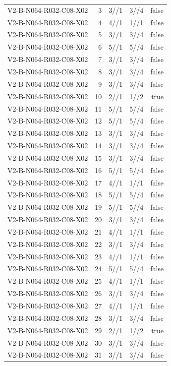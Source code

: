 {\begin{longtable}{lrrrr}
V2-B-N064-R032-C08-X02 & 3 & 3//1 & 3//4 & false \\
V2-B-N064-R032-C08-X02 & 4 & 4//1 & 1//1 & false \\
V2-B-N064-R032-C08-X02 & 5 & 3//1 & 3//4 & false \\
V2-B-N064-R032-C08-X02 & 6 & 5//1 & 5//4 & false \\
V2-B-N064-R032-C08-X02 & 7 & 3//1 & 3//4 & false \\
V2-B-N064-R032-C08-X02 & 8 & 3//1 & 3//4 & false \\
V2-B-N064-R032-C08-X02 & 9 & 3//1 & 3//4 & false \\
V2-B-N064-R032-C08-X02 & 10 & 2//1 & 1//2 & true \\
V2-B-N064-R032-C08-X02 & 11 & 5//1 & 5//4 & false \\
V2-B-N064-R032-C08-X02 & 12 & 5//1 & 5//4 & false \\
V2-B-N064-R032-C08-X02 & 13 & 3//1 & 3//4 & false \\
V2-B-N064-R032-C08-X02 & 14 & 3//1 & 3//4 & false \\
V2-B-N064-R032-C08-X02 & 15 & 3//1 & 3//4 & false \\
V2-B-N064-R032-C08-X02 & 16 & 5//1 & 5//4 & false \\
V2-B-N064-R032-C08-X02 & 17 & 4//1 & 1//1 & false \\
V2-B-N064-R032-C08-X02 & 18 & 5//1 & 5//4 & false \\
V2-B-N064-R032-C08-X02 & 19 & 5//1 & 5//4 & false \\
V2-B-N064-R032-C08-X02 & 20 & 3//1 & 3//4 & false \\
V2-B-N064-R032-C08-X02 & 21 & 4//1 & 1//1 & false \\
V2-B-N064-R032-C08-X02 & 22 & 3//1 & 3//4 & false \\
V2-B-N064-R032-C08-X02 & 23 & 4//1 & 1//1 & false \\
V2-B-N064-R032-C08-X02 & 24 & 5//1 & 5//4 & false \\
V2-B-N064-R032-C08-X02 & 25 & 4//1 & 1//1 & false \\
V2-B-N064-R032-C08-X02 & 26 & 3//1 & 3//4 & false \\
V2-B-N064-R032-C08-X02 & 27 & 4//1 & 1//1 & false \\
V2-B-N064-R032-C08-X02 & 28 & 3//1 & 3//4 & false \\
V2-B-N064-R032-C08-X02 & 29 & 2//1 & 1//2 & true \\
V2-B-N064-R032-C08-X02 & 30 & 3//1 & 3//4 & false \\
V2-B-N064-R032-C08-X02 & 31 & 3//1 & 3//4 & false \\

\end{longtable}}
